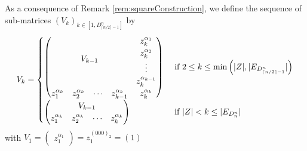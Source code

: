 \documentclass[11pt]{llncs}
\begin{document}
\begin{definition}\label{def:inductiveConstructionOfV}
    As a consequence of Remark \ref{rem:squareConstruction}, we define the sequence of sub-matrices $\left(V_k\right)_{k\in [1,D_{\lceil{n/2}\rceil-1}^n]}$ by
    \begin{align*}
        V_k = 
        \begin{cases}
            \begin{pmatrix}
        \multicolumn{4}{c}{\multirow{4}{*}{$V_{k-1}$}} & z_k^{\alpha_{1}}\\
        & & & & z_k^{\alpha_{2}}\\
        & & & & \vdots\\
        & & & & z_k^{\alpha_{k-1}}\\
        z_1^{\alpha_{k}} & z_{2}^{\alpha_k}& \cdots & z_{k-1}^{\alpha_{k}} & z_{k}^{\alpha_{k}}
    \end{pmatrix} & \mbox{ if } 2\leq k \leq \min{\left(|Z|, |E_{D_{\lceil{n/2}\rceil-1}^n}|\right)}\\
    \begin{pmatrix}
        \multicolumn{4}{c}{\multirow{1}{*}{$V_{k-1}$}} \\
        z_1^{\alpha_k} & z_2^{\alpha_k} & \cdots & z_{k}^{\alpha_k}
    \end{pmatrix} & \mbox{ if } |Z| < k \leq |E_{D_n^n}|
        \end{cases}
    \end{align*}
    with $V_1 = \begin{pmatrix} z_1^{\alpha_1}\end{pmatrix} = z_1^{(000)_2} = (1)$ 
\end{definition}
\end{document}
